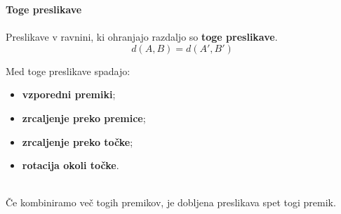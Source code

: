         \begin{frame}
            \large\textbf{Toge preslikave}
            ~\\
            ~\\
            \normalsize
                Preslikave v ravnini, ki ohranjajo razdaljo so \textbf{toge preslikave}.
                $$d(A,B)=d(A',B')$$

                Med toge preslikave spadajo:
                \begin{itemize}
                    \item \textbf{vzporedni premiki};
                    \item \textbf{zrcaljenje preko premice};
                    \item \textbf{zrcaljenje preko točke};
                    \item \textbf{rotacija okoli točke}.
                \end{itemize}

                ~\\
                Če kombiniramo več togih premikov, je dobljena preslikava spet togi premik.

        \end{frame}

